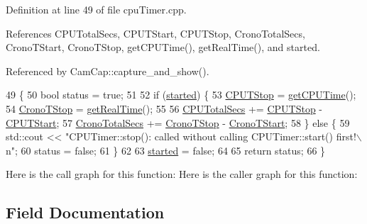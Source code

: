 Definition at line 49 of file cpu\+Timer.\+cpp.



References C\+P\+U\+Total\+Secs, C\+P\+U\+T\+Start, C\+P\+U\+T\+Stop, Crono\+Total\+Secs, Crono\+T\+Start, Crono\+T\+Stop, get\+C\+P\+U\+Time(), get\+Real\+Time(), and started.



Referenced by Cam\+Cap\+::capture\+\_\+and\+\_\+show().


\begin{DoxyCode}
49                     \{
50     \textcolor{keywordtype}{bool} status = \textcolor{keyword}{true};
51 
52     \textcolor{keywordflow}{if} (\hyperlink{class_c_p_u_timer_a8fde2f68dd2f4811400429dcf9a4a6c7}{started}) \{
53         \hyperlink{class_c_p_u_timer_a02e800ccdca6291ee1d00b4c805d69c1}{CPUTStop} = \hyperlink{class_c_p_u_timer_a3403f8cce7b7518e47a1826b8650220c}{getCPUTime}();
54         \hyperlink{class_c_p_u_timer_aaeaf8c0445112562f3b85ad93994d194}{CronoTStop} = \hyperlink{class_c_p_u_timer_a57da0f833904f3ddf20a640e0f8fe127}{getRealTime}();
55 
56         \hyperlink{class_c_p_u_timer_a1f61a2313ec71eb67d658c482420abe7}{CPUTotalSecs} += \hyperlink{class_c_p_u_timer_a02e800ccdca6291ee1d00b4c805d69c1}{CPUTStop} - \hyperlink{class_c_p_u_timer_a0248a7ebc1ed9fb9bcd4f63f07f9f984}{CPUTStart};
57         \hyperlink{class_c_p_u_timer_a9c8ac2ee9f44e8b4365321698cf17493}{CronoTotalSecs} += \hyperlink{class_c_p_u_timer_aaeaf8c0445112562f3b85ad93994d194}{CronoTStop} - \hyperlink{class_c_p_u_timer_a097a928f647be3a1e679d702a74119ed}{CronoTStart};
58     \} \textcolor{keywordflow}{else} \{
59         std::cout << \textcolor{stringliteral}{"CPUTimer::stop(): called without calling CPUTimer::start() first!\(\backslash\)n"};
60         status = \textcolor{keyword}{false};
61     \}
62 
63     \hyperlink{class_c_p_u_timer_a8fde2f68dd2f4811400429dcf9a4a6c7}{started} = \textcolor{keyword}{false};
64 
65     \textcolor{keywordflow}{return} status;
66 \}
\end{DoxyCode}
Here is the call graph for this function\+:
Here is the caller graph for this function\+:


\subsection{Field Documentation}
\mbox{\label{class_c_p_u_timer_aa34930f260364d48351fac6f5b926c82}} 

